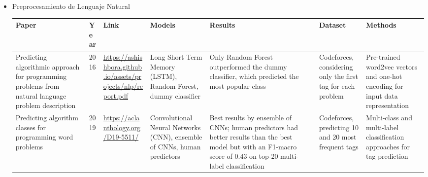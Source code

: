 \documentclass{article}
\begin{document}
\begin{itemize}
    \item Preprocesamiento de Lenguaje Natural
          
          \begin{longtable}{|p{2cm}|p{0.8cm}|p{2cm}|p{2cm}|p{3cm}|p{2cm}|p{3cm}|}
              \hline
              \textbf{Paper} & \textbf{Year}                                                                                                                                                       & \textbf{Link} & \textbf{Models} & \textbf{Results} & \textbf{Dataset} & \textbf{Methods} \\
              \hline
              \endfirsthead
              
              \hline
              \endfoot
              
              \hline
              \endlastfoot
              
              
              Predicting algorithmic approach for programming problems from natural language problem description 
                             & 2016 
                             & \href{https://ashishbora.github.io/assets/projects/nlp/report.pdf}{\url{https://ashishbora.github.io/assets/projects/nlp/report.pdf}}

              
              
              
                             & Long Short Term Memory (LSTM), Random Forest, dummy classifier 
                             & Only Random Forest outperformed the dummy classifier, which predicted the most popular class 
                             & Codeforces, considering only the first tag for each problem 
                             & Pre-trained word2vec vectors and one-hot encoding for input data representation                                                                                                                                                                                \\
              
              \hline
              Predicting algorithm classes for programming word problems
                             & 2019
                             & \href{https://aclanthology.org/D19-5511/}{\url{https://aclanthology.org/D19-5511/}}

              
              
              
                             & Convolutional Neural Networks (CNN), ensemble of CNNs, human predictors 
                             & Best results by ensemble of CNNs; human predictors had better results than the best model but with an F1-macro score of 0.43 on top-20 multi-label classification 
                             & Codeforces, predicting 10 and 20 most frequent tags 
                             & Multi-class and multi-label classification approaches for tag prediction                                                                                                                                                                                       \\
              

\end{longtable}
\end{itemize}
\end{document}
